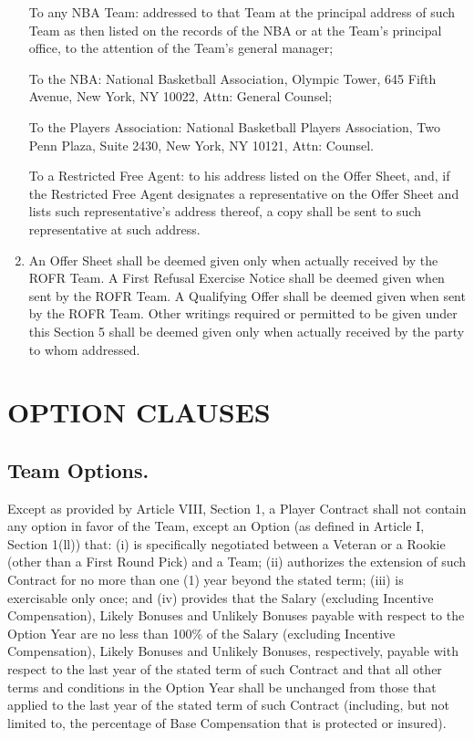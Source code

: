\documentclass[
]{book}
\begin{document}
\begin{enumerate}
  To any NBA Team: addressed to that Team at the principal address of such Team as then listed on the records of the NBA or at the Team's principal office, to the attention of the Team's general manager;

  To the NBA: National Basketball Association, Olympic Tower, 645 Fifth Avenue, New York, NY 10022, Attn: General Counsel;

  To the Players Association: National Basketball Players Association, Two Penn Plaza, Suite 2430, New York, NY 10121, Attn: Counsel.

  To a Restricted Free Agent: to his address listed on the Offer Sheet, and, if the Restricted Free Agent designates a representative on the Offer Sheet and lists such representative's address thereof, a copy shall be sent to such representative at such address.
\item
  An Offer Sheet shall be deemed given only when actually received by the ROFR Team. A First Refusal Exercise Notice shall be deemed given when sent by the ROFR Team. A Qualifying Offer shall be deemed given when sent by the ROFR Team. Other writings required or permitted to be given under this Section 5 shall be deemed given only when actually received by the party to whom addressed.
\end{enumerate}

\hypertarget{option-clauses}{%
\chapter{OPTION CLAUSES}\label{option-clauses}}

\hypertarget{team-options.}{%
\section{Team Options.}\label{team-options.}}

Except as provided by Article VIII, Section 1, a Player Contract shall not contain any option in favor of the Team, except an Option (as defined in Article I, Section 1(ll)) that: (i) is specifically negotiated between a Veteran or a Rookie (other than a First Round Pick) and a Team; (ii) authorizes the extension of such Contract for no more than one (1) year beyond the stated term; (iii) is exercisable only once; and (iv) provides that the Salary (excluding Incentive Compensation), Likely Bonuses and Unlikely Bonuses payable with respect to the Option Year are no less than 100\% of the Salary (excluding Incentive Compensation), Likely Bonuses and Unlikely Bonuses, respectively, payable with respect to the last year of the stated term of such Contract and that all other terms and conditions in the Option Year shall be unchanged from those that applied to the last year of the stated term of such Contract (including, but not limited to, the percentage of Base Compensation that is protected or insured).
\end{document}

